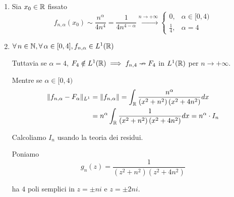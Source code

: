 \Soluzione

\begin{enumerate}
\item Sia $x_{0} \in \RR $ fissato
\begin{equation*}
f_{n, \alpha}(x_{0}) \sim \frac{n^{\alpha}}{4n^{4}} = \frac{1}{4n^{4 - \alpha}}\xrightarrow{n\rightarrow + \infty}
\begin{cases}
0, & \alpha \in [ 0, 4)\\
\frac{1}{4}, & \alpha = 4
\end{cases}
\end{equation*}
\item $\forall n\in \NN, \forall \alpha \in [ 0, 4], f_{n, \alpha} \in L^{1}(\RR)$

Tuttavia se $\alpha = 4$, $F_{4} \notin L^{1}(\RR) \implies f_{n, 4} \nrightarrow F_{4}$ in $L^{1}(\RR)$ per $n\rightarrow + \infty $.

Mentre se $\alpha \in [ 0, 4)$
\begin{equation*}
\begin{aligned}
\Vert f_{n, \alpha} - F_{\alpha}\Vert_{L^{1}} & = \Vert f_{n, \alpha}\Vert = \int_{\RR}\frac{n^{\alpha}}{\left(x^{2} + n^{2}\right)\left(x^{2} + 4n^{2}\right)} dx\\
 & = n^{\alpha}\int_{\RR}\frac{1}{\left(x^{2} + n^{2}\right)\left(x^{2} + 4n^{2}\right)} dx = n^{\alpha} \cdot I_{n}
\end{aligned}
\end{equation*}

Calcoliamo $I_{n}$ usando la teoria dei residui.

Poniamo
\begin{equation*}
g_{n}(z) = \frac{1}{\left(z^{2} + n^{2}\right)\left(z^{2} + 4n^{2}\right)}
\end{equation*}

ha $4$ poli semplici in $z = \pm ni$ e $z = \pm 2ni$.

\begin{figure}[htpb]
	\centering
{} %

\begin{tikzpicture}[x = 0.75pt, y = 0.75pt, yscale = -1, xscale = 1]


\end{tikzpicture}
\end{figure}
\end{enumerate}
